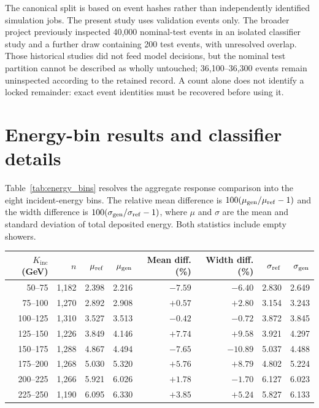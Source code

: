 \documentclass[11pt]{article}
\newcommand{\Kinc}{K_{\mathrm{inc}}}
\begin{document}
The canonical split is based on event hashes rather than independently identified simulation jobs. The present study uses validation events only. The broader project previously inspected 40,000 nominal-test events in an isolated classifier study and a further draw containing 200 test events, with unresolved overlap. Those historical studies did not feed model decisions, but the nominal test partition cannot be described as wholly untouched; 36,100--36,300 events remain uninspected according to the retained record. A count alone does not identify a locked remainder: exact event identities must be recovered before using it.

\section{Energy-bin results and classifier details}
\label{app:additional}

Table~\ref{tab:energy_bins} resolves the aggregate response comparison into the eight incident-energy bins. The relative mean difference is $100(\mu_{\rm gen}/\mu_{\rm ref}-1)$ and the width difference is $100(\sigma_{\rm gen}/\sigma_{\rm ref}-1)$, where $\mu$ and $\sigma$ are the mean and standard deviation of total deposited energy. Both statistics include empty showers.

\begin{center}
\begin{minipage}{\linewidth}
\centering
{}
\label{tab:energy_bins}
\small
\begin{tabular}{@{}rrrrrrrr@{}}
\toprule
$\Kinc$ (GeV) & $n$ & $\mu_{\rm ref}$ & $\mu_{\rm gen}$ & Mean diff. (\%) & Width diff. (\%) & $\sigma_{\rm ref}$ & $\sigma_{\rm gen}$ \\
\midrule
50--75 & 1,182 & 2.398 & 2.216 & $-7.59$ & $-6.40$ & 2.830 & 2.649 \\
75--100 & 1,270 & 2.892 & 2.908 & $+0.57$ & $+2.80$ & 3.154 & 3.243 \\
100--125 & 1,310 & 3.527 & 3.513 & $-0.42$ & $-0.72$ & 3.872 & 3.845 \\
125--150 & 1,226 & 3.849 & 4.146 & $+7.74$ & $+9.58$ & 3.921 & 4.297 \\
150--175 & 1,288 & 4.867 & 4.494 & $-7.65$ & $-10.89$ & 5.037 & 4.488 \\
175--200 & 1,268 & 5.030 & 5.320 & $+5.76$ & $+8.79$ & 4.802 & 5.224 \\
200--225 & 1,266 & 5.921 & 6.026 & $+1.78$ & $-1.70$ & 6.127 & 6.023 \\
225--250 & 1,190 & 6.095 & 6.330 & $+3.85$ & $+5.24$ & 5.827 & 6.133 \\
\bottomrule
\end{tabular}
\end{minipage}
\end{center}
\end{document}
